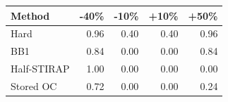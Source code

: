 \begin{tabular}{lrrrr}
\toprule
Method & -40\% & -10\% & +10\% & +50\% \\
\midrule
Hard & 0.96 & 0.40 & 0.40 & 0.96 \\
BB1 & 0.84 & 0.00 & 0.00 & 0.84 \\
Half-STIRAP & 1.00 & 0.00 & 0.00 & 0.00 \\
Stored OC & 0.72 & 0.00 & 0.00 & 0.24 \\
\bottomrule
\end{tabular}